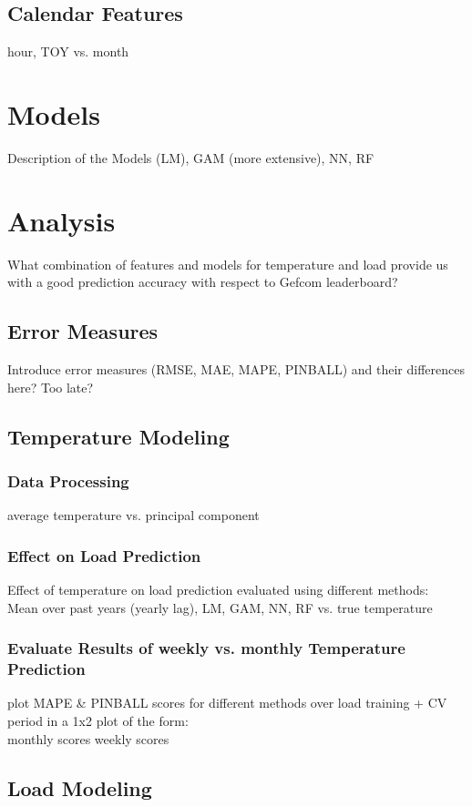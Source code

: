 \documentclass{article}
\begin{document}
\subsection{Calendar Features}
hour, TOY vs. month

\section{Models}
Description of the Models (LM), GAM (more extensive), NN, RF

\section{Analysis}
What combination of features and models for temperature and load provide us with a good prediction accuracy with respect to Gefcom leaderboard?

\subsection{Error Measures}
Introduce error measures (RMSE, MAE, MAPE, PINBALL) and their differences here? Too late?

\subsection{Temperature Modeling}
\subsubsection{Data Processing}
average temperature vs. principal component

\subsubsection{Effect on Load Prediction}
Effect of temperature on load prediction evaluated using different methods:\\
Mean over past years (yearly lag), LM, GAM, NN, RF vs. true temperature

\subsubsection{Evaluate Results of weekly vs. monthly Temperature Prediction}
plot MAPE \& PINBALL scores for different methods over load training + CV period in a 1x2 plot of the form:\\
monthly scores \quad weekly scores

\subsection{Load Modeling}
\end{document}

